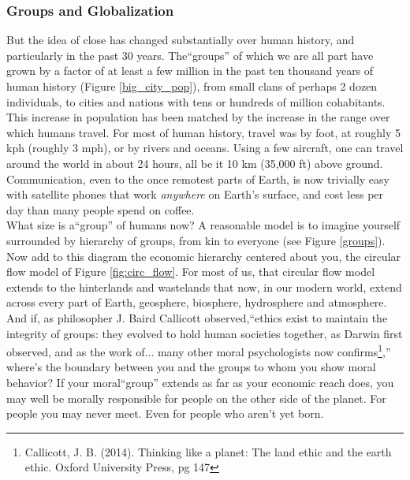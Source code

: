 \subsubsection{Groups and Globalization}\label{groups_global}
But the idea of close has changed substantially over human history, and particularly in the past 30 years. The``groups'' of which we are all part have grown by a factor of at least a few million in the past ten thousand years of human history (Figure \ref{big_city_pop}), from small clans of perhaps 2 dozen individuals, to cities and nations with tens or hundreds of million cohabitants. This increase in population has been matched by the increase in the range over which humans travel. For most of human history, travel was by foot, at roughly 5 kph (roughly 3 mph), or by rivers and oceans. Using a few aircraft, one can travel around the world in about 24 hours, all be it 10 km (35,000 ft) above ground. Communication, even to the once remotest parts of Earth, is now trivially easy with satellite phones that work \emph{anywhere} on Earth's surface, and cost less per day than many people spend on coffee. \\

What size is a``group'' of humans now? A reasonable model is to imagine yourself surrounded by  hierarchy of groups, from kin to everyone (see Figure \ref{groups}). Now add to this diagram the economic hierarchy centered about you, the circular flow model of Figure \ref{fig:circ_flow}. For most of us, that circular flow model extends to the hinterlands and wastelands that now, in our modern world, extend across every part of Earth, geosphere, biosphere, hydrosphere and atmosphere. And if, as philosopher J. Baird Callicott observed,``ethics exist to maintain the integrity of groups: they evolved to hold human societies together, as Darwin first observed, and as the work of... many other moral psychologists now confirms\footnote{Callicott, J. B. (2014). Thinking like a planet: The land ethic and the earth ethic. Oxford University Press, pg 147},'' where's the boundary between you and the groups to whom you show moral behavior? If your moral``group'' extends as far as your economic reach does, you may well be morally responsible for people on the other side of the planet. For people you may never meet. Even for people who aren't yet born.\\

